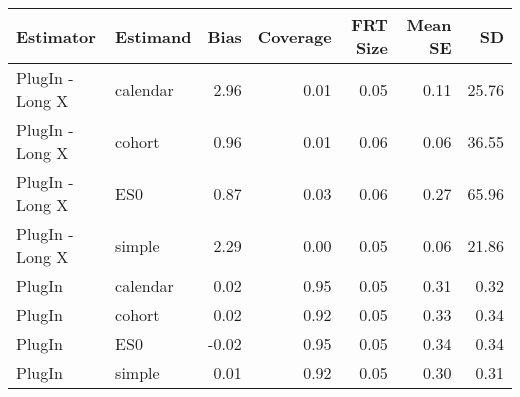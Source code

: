 \captionsetup[table]{labelformat=empty,skip=1pt}
\begin{longtable}{llrrrrr}
\toprule
Estimator & Estimand & Bias & Coverage & FRT Size & Mean SE & SD \\ 
\midrule
PlugIn - Long X & calendar & 2.96 & 0.01 & 0.05 & 0.11 & 25.76 \\ 
PlugIn - Long X & cohort & 0.96 & 0.01 & 0.06 & 0.06 & 36.55 \\ 
PlugIn - Long X & ES0 & 0.87 & 0.03 & 0.06 & 0.27 & 65.96 \\ 
PlugIn - Long X & simple & 2.29 & 0.00 & 0.05 & 0.06 & 21.86 \\ 
PlugIn & calendar & 0.02 & 0.95 & 0.05 & 0.31 & 0.32 \\ 
PlugIn & cohort & 0.02 & 0.92 & 0.05 & 0.33 & 0.34 \\ 
PlugIn & ES0 & -0.02 & 0.95 & 0.05 & 0.34 & 0.34 \\ 
PlugIn & simple & 0.01 & 0.92 & 0.05 & 0.30 & 0.31 \\ 
 \bottomrule
\end{longtable}

